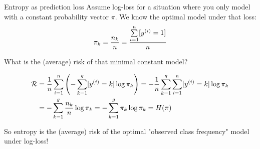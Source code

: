 \documentclass[11pt,compress,t,notes=noshow, xcolor=table]{beamer}
\begin{document}
\begin{vbframe}{Entropy as prediction loss}
Assume log-loss for a situation where you only model with a constant probability vector $\pi$. We know the optimal model under that loss: 
$$\pi_{k} = \frac{n_k}{n} = \frac{\sum\limits_{i=1}^n [y^{(i)} = 1]}{n}$$

What is the (average) risk of that minimal constant model?

\begin{align*}
  \mathcal{R} &= \frac{1}{n} \sum\limits_{i=1}^n \left( -\sum\limits_{k=1}^g [y^{(i)} = k]\log \pi_{k} \right) = - \frac{1}{n} \sum\limits_{k=1}^g \sum\limits_{i=1}^n [y^{(i)} = k]\log \pi_{k}  \\
        &= -\sum\limits_{k=1}^g \frac{n_k}{n}\log \pi_{k} = -\sum\limits_{k=1}^g \pi_k \log \pi_{k} = H(\pi) 
\end{align*}

So entropy is the (average) risk of the optimal "observed class frequency" model under log-loss! 
 
\end{vbframe}

  
\endlecture
\end{document}
